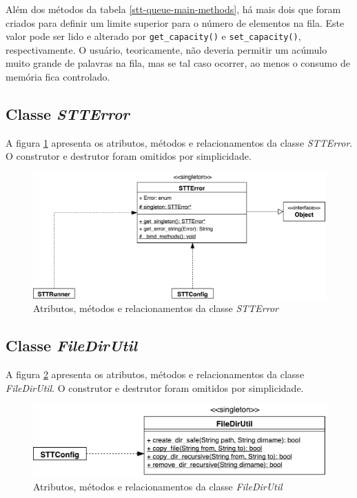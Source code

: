 Além dos métodos da tabela \ref{stt-queue-main-methods}, há mais dois que foram criados para definir um limite superior para o número de elementos na fila. Este valor pode ser lido e alterado por \texttt{get\_capacity()} e \texttt{set\_capacity()}, respectivamente. O usuário, teoricamente, não deveria permitir um acúmulo muito grande de palavras na fila, mas se tal caso ocorrer, ao menos o consumo de memória fica controlado.


\subsection{Classe \textit{STTError}}

A figura \ref{stt-error} apresenta os atributos, métodos e relacionamentos da classe \textit{STTError}. O construtor e destrutor foram omitidos por simplicidade.

\begin{figure}[H]
  \centering
  \includegraphics[width=.9\textwidth]{image/stt-error.pdf}
  \caption{Atributos, métodos e relacionamentos da classe \textit{STTError}}
  \label{stt-error}
\end{figure}


\subsection{Classe \textit{FileDirUtil}}

A figura \ref{file-dir-util} apresenta os atributos, métodos e relacionamentos da classe \textit{FileDirUtil}. O construtor e destrutor foram omitidos por simplicidade.

\begin{figure}[H]
  \centering
  \includegraphics[width=.75\textwidth]{image/file-dir-util.pdf}
  \caption{Atributos, métodos e relacionamentos da classe \textit{FileDirUtil}}
  \label{file-dir-util}
\end{figure}

